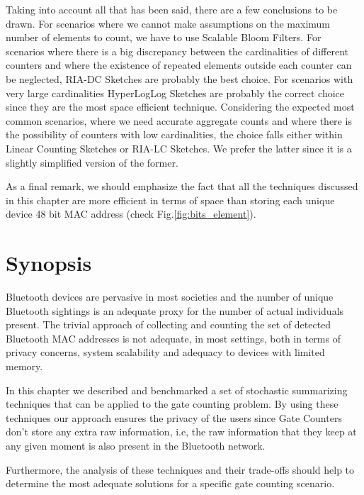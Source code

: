 Taking into account all that has been said, there are a few
conclusions to be drawn. For scenarios where we cannot make
assumptions on the maximum number of elements to count, we have to use
Scalable Bloom Filters. For scenarios where there is a big discrepancy
between the cardinalities of different counters and where the
existence of repeated elements outside each counter can be neglected,
RIA-DC Sketches are probably the best choice. For scenarios with very
large cardinalities HyperLogLog Sketches are probably the correct
choice since they are the most space efficient technique.  Considering
the expected most common scenarios, where we need accurate aggregate
counts and where there is the possibility of counters with low
cardinalities, the choice falls either within Linear Counting Sketches
or RIA-LC Sketches. We prefer the latter since it is a slightly
simplified version of the former.

As a final remark, we should emphasize the fact that all the
techniques discussed in this chapter are more efficient in terms of
space than storing each unique device 48 bit MAC address (check
Fig.\ref{fig:bits_element}).

\section{Synopsis}
\label{sec:conclusion}
Bluetooth devices are pervasive in most societies and the number of unique
Bluetooth sightings is an adequate proxy for the number of actual individuals
present. The trivial approach of collecting and counting the set of detected
Bluetooth MAC addresses is not adequate, in most settings, both in terms of
privacy concerns, system scalability and adequacy to devices with limited
memory.  

In this chapter we described and benchmarked a set of stochastic summarizing
techniques that can be applied to the gate counting problem. By using these
techniques our approach ensures the privacy of the users since Gate Counters
don't store any extra raw information, i.e, the raw information that
they keep at any given moment is also present in the Bluetooth network. 
  
Furthermore, the analysis of these techniques and their trade-offs
should help to determine the most adequate solutions for a specific
gate counting scenario. %

